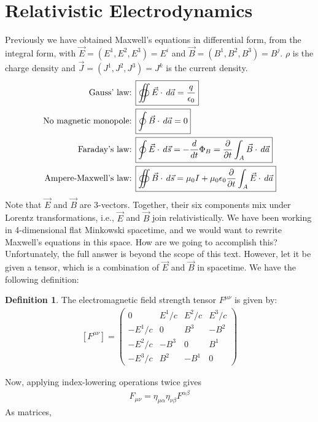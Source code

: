 \documentclass{book}
\theoremstyle{definition}
\newtheorem{defn}{Definition}[section]
\begin{document}
\section{Relativistic Electrodynamics}
Previously we have obtained Maxwell's equations in differential form, from the integral form, with $\vec{E} = \left( E^1, E^2, E^3 \right) = E^i $ and $\vec{B} = \left( B^1, B^2, B^3 \right) = B^j $. $\rho$ is the charge density and $\vec{J} = \left( J^1, J^2, J^3 \right)=J^k$ is the current density.
\begin{align*}
\text{Gauss' law:  } \Aboxed{&\oiint\vec{E}\cdot\,d\vec{a} = \frac{q}{\epsilon_0}}\\
\text{No magnetic monopole:  } \Aboxed{&\oint\vec{B}\cdot\,d\vec{a} = 0}\\
\text{Faraday's law:  } 
\Aboxed{&\oint \vec{E}\cdot\,d\vec{s} = -\frac{d}{dt}\Phi_B = \frac{\partial}{\partial t}\int_A\vec{B}\cdot\,d\vec{a}}\\  
\text{Ampere-Maxwell's law:  } 
\Aboxed{&\oiint \vec{B}\cdot\,d\vec{s} = \mu_0I + \mu_0\epsilon_0\frac{\partial}{\partial t}\int_A\vec{E}\cdot\,d\vec{a}}
\end{align*}
Note that $\vec{E}$ and $\vec{B}$ are 3-vectors. Together, their six components mix under Lorentz transformations, i.e., $\vec{E}$ and $\vec{B}$ join relativistically. We have been working in 4-dimensional flat Minkowski spacetime, and we would want to rewrite Maxwell's equations in this space. How are we going to accomplish this? Unfortunately, the full answer is beyond the scope of this text. However, let it be given a tensor, which is a combination of $\vec{E}$ and $\vec{B}$ in spacetime. We have the following definition:
\begin{defn}
	The electromagnetic field strength tensor $F^{\mu\nu}$ is given by:
	\begin{align*}
	\boxed{[F^{\mu\nu}] = 
	\begin{pmatrix}
	0 & E^1/c & E^2/c & E^3/c\\
	-E^1/c & 0 & B^3 & -B^2\\
	-E^2/c & -B^3 & 0 & B^1\\
	-E^3/c & B^2 & -B^1 & 0
	\end{pmatrix}}
	\end{align*}
\end{defn}
Now, applying index-lowering operations twice gives
\begin{align*}
\boxed{F_{\mu\nu} = \eta_{\mu\alpha}\eta_{\nu\beta}F^{\alpha\beta}}
\end{align*}
As matrices,
\end{document}
